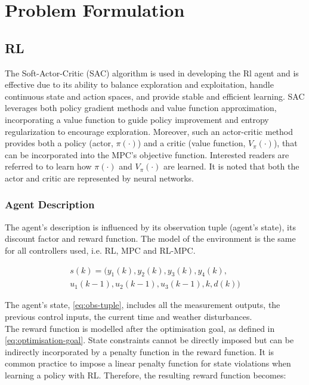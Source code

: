 \section{Problem Formulation}

\subsection{RL}
The Soft-Actor-Critic (SAC) algorithm is used in developing the Rl agent and is effective due to its ability to balance exploration and exploitation, handle continuous state and action spaces, and provide stable and efficient learning. SAC leverages both policy gradient methods and value function approximation, incorporating a value function to guide policy improvement and entropy regularization to encourage exploration. Moreover, such an actor-critic method provides both a policy (actor, $\pi (\cdot) $) and a critic (value function, $V_\pi (\cdot)$), that can be incorporated into the MPC's objective function. Interested readers are referred to \cite{SoftActorCriticSpinning} to learn how $\pi(\cdot)$ and $V_\pi(\cdot)$ are learned. It is noted that both the actor and critic are represented by neural networks.

\subsubsection{Agent Description}
The agent's description is influenced by its observation tuple (agent's state), its discount factor and reward function. The model of the environment is the same for all controllers used, i.e. RL, MPC and RL-MPC.

\begin{multline}\label{eq:obs-tuple}
	s(k) = (y_1(k),y_2(k),y_3(k),y_4(k), \\u_1(k-1), u_2(k-1), u_3(k-1), k, d(k))
\end{multline}

The agent's state, \autoref{eq:obs-tuple}, includes all the measurement outputs, the previous control inputs, the current time and weather disturbances. \\
The reward function is modelled after the optimisation goal, as defined in \autoref{eq:optimisation-goal}. State constraints cannot be directly imposed but can be indirectly incorporated by a penalty function in the reward function. It is common practice to impose a linear penalty function for state violations when learning a policy with RL. Therefore, the resulting reward function becomes:

